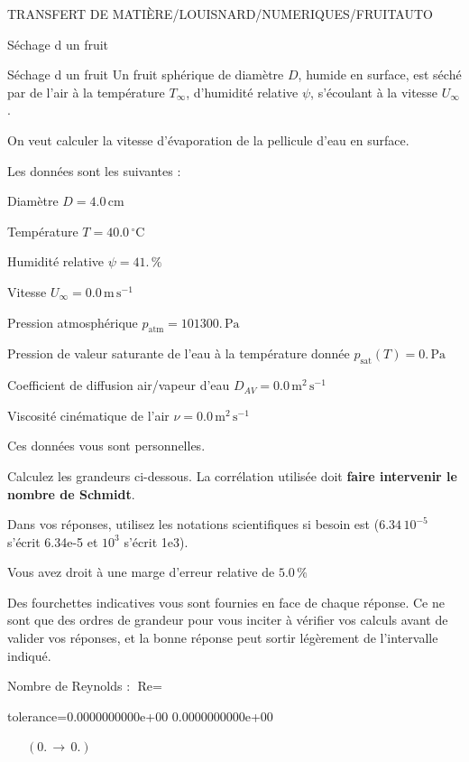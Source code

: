 \documentclass[12pt]{article}
\begin{document}
\begin{quiz}{TRANSFERT DE MATIÈRE/LOUISNARD/NUMERIQUES/FRUITAUTO}
\begin{cloze}{Séchage d un fruit}
\end{cloze} 


 \begin{cloze}{Séchage d un fruit} 
Un fruit sphérique de diamètre $D$, humide en surface, est séché par de l'air à la température $T_\infty$, d'humidité relative $\psi$, s'écoulant à la vitesse $U_\infty$.

On veut calculer la vitesse d'évaporation de la pellicule d'eau en surface.

 

Les données sont les suivantes :

 

Diamètre $D = 4.0\,  \mathrm{cm} $

Température $T = 40.0\,  \mathrm{^\circ\mathrm{C}} $

Humidité relative $\psi = 41.\, \% $

Vitesse $U_\infty = 0.0\,  \mathrm{m}\,  \mathrm{s}^{-1} $

Pression atmosphérique $p_{\text{atm}} = 101300.\,  \mathrm{Pa} $

Pression de valeur saturante de l’eau à la température donnée $p_{\text{sat}}(T) = 0.\,  \mathrm{Pa} $

Coefficient de diffusion air/vapeur d’eau $D_{AV} = 0.0\,  \mathrm{m}^{2}\,  \mathrm{s}^{-1} $

Viscosité cinématique de l’air $\nu = 0.0\,  \mathrm{m}^{2}\,  \mathrm{s}^{-1} $

Ces données vous sont personnelles.

 

Calculez les grandeurs ci-dessous. La corrélation utilisée doit \textbf{faire intervenir le nombre de Schmidt}.

Dans vos réponses, utilisez les notations scientifiques si besoin est ($6.34\, 10^{-5}$ s'écrit 6.34e-5 et $10^{3}$ s'écrit 1e3).

Vous avez droit à une marge d'erreur relative de $5.0\, \% $

Des fourchettes indicatives vous sont fournies en face de chaque réponse. Ce ne sont que des ordres de grandeur pour vous inciter à vérifier vos calculs avant de valider vos réponses, et la bonne réponse peut sortir légèrement de l'intervalle indiqué.

 

Nombre de Reynolds : $\text{Re} =  $
\begin{numerical}[points=1] 
\item[tolerance={0.0000000000e+00}] 0.0000000000e+00 
\end{numerical} 
 $\,$ 
 $ \quad (0. \, \rightarrow \, 0.) $ 


\end{cloze}
\end{quiz}
\end{document}
